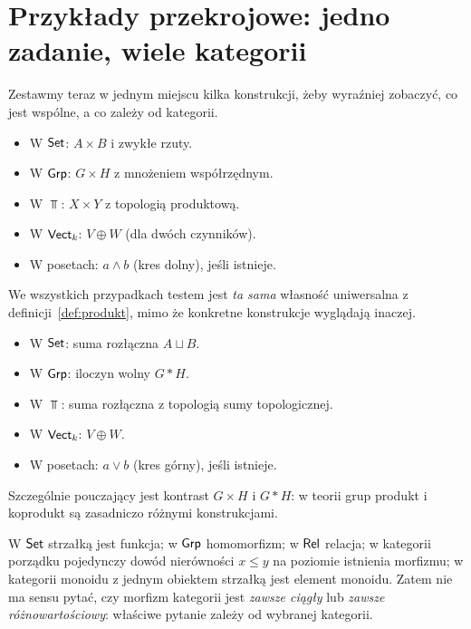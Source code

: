 \section{Przykłady przekrojowe: jedno zadanie, wiele kategorii}\label{sec:przekrojowe}

Zestawmy teraz w jednym miejscu kilka konstrukcji, żeby wyraźniej zobaczyć, co jest wspólne, a co zależy od kategorii.

\begin{przyklad}
\leavevmode\par\noindent
\begin{itemize}
\item W $\mathsf{Set}$: $A\times B$ i zwykłe rzuty.
\item W $\mathsf{Grp}$: $G\times H$ z mnożeniem współrzędnym.
\item W $\Top$: $X\times Y$ z topologią produktową.
\item W $\mathsf{Vect}_k$: $V\oplus W$ (dla dwóch czynników).
\item W posetach: $a\wedge b$ (kres dolny), jeśli istnieje.
\end{itemize}
We wszystkich przypadkach testem jest \emph{ta sama} własność uniwersalna z definicji~\ref{def:produkt}, mimo że konkretne konstrukcje wyglądają inaczej.
\end{przyklad}

\begin{przyklad}
\leavevmode\par\noindent
\begin{itemize}
\item W $\mathsf{Set}$: suma rozłączna $A\sqcup B$.
\item W $\mathsf{Grp}$: iloczyn wolny $G*H$.
\item W $\Top$: suma rozłączna z topologią sumy topologicznej.
\item W $\mathsf{Vect}_k$: $V\oplus W$.
\item W posetach: $a\vee b$ (kres górny), jeśli istnieje.
\end{itemize}
Szczególnie pouczający jest kontrast $G\times H$ i $G*H$: w teorii grup produkt i koprodukt są zasadniczo różnymi konstrukcjami.
\end{przyklad}

\begin{przyklad}
W $\mathsf{Set}$ strzałką jest funkcja; w $\mathsf{Grp}$ homomorfizm; w $\mathsf{Rel}$ relacja; w kategorii porządku pojedynczy dowód nierówności $x\leq y$ na poziomie istnienia morfizmu; w kategorii monoidu z jednym obiektem strzałką jest element monoidu. Zatem nie ma sensu pytać, czy morfizm kategorii jest \emph{zawsze ciągły} lub \emph{zawsze różnowartościowy}: właściwe pytanie zależy od wybranej kategorii.
\end{przyklad}

